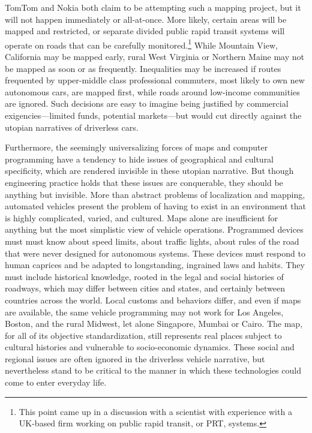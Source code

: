 TomTom\cite{???} and Nokia\cite{???} both claim to be attempting such a mapping project,
but it will not happen immediately or all-at-once. More likely,
certain areas will be 
mapped and restricted, or separate divided public rapid transit
systems will operate on roads that can be carefully
monitored.\footnote{This point came up in a discussion with a
  scientist with experience with a UK-based firm working on public
  rapid transit, or PRT, systems.} While
Mountain View, California may be mapped early, rural West Virginia or
Northern Maine may not be mapped as soon or as frequently.
Inequalities may be increased if routes frequented by upper-middle
class professional commuters, most likely to own new autonomous cars,
are mapped first, while roads around low-income communities are
ignored. Such decisions are easy to imagine being justified by
commercial exigencies---limited funds, potential markets---but would
cut directly against the utopian narratives of driverless cars.

Furthermore, the seemingly universalizing forces of maps and computer programming
have a tendency to hide issues of geographical and cultural
specificity, which are rendered invisible in these utopian narrative.
But though engineering practice holds that these issues are
conquerable, they should be anything but invisible. More than
abstract problems of localization and mapping, automated vehicles
present the problem of having to exist in an environment that is
highly complicated, varied, and cultured. Maps alone are insufficient
for anything but the most simplistic view of vehicle operations.
Programmed devices
must must know about speed limits, about traffic
lights, about rules of the road that were never designed for
autonomous systems. These devices must respond to human caprices and
be adapted to longstanding, ingrained laws and habits. They must
include historical knowledge, rooted in the legal and social histories
of roadways, which may differ between cities and states, and certainly
between countries across the world. Local customs and behaviors differ, and even if maps are
available, the same vehicle programming may not work for Los Angeles,
Boston, and the rural Midwest, let alone Singapore, Mumbai or Cairo.
The map, for all of its objective standardization, still represents
real places subject to cultural histories and vulnerable to
socio-economic dynamics. These social and regional issues are often
ignored in the driverless vehicle narrative, but nevertheless stand to
be critical to the manner in which these technologies could come to
enter everyday life.



